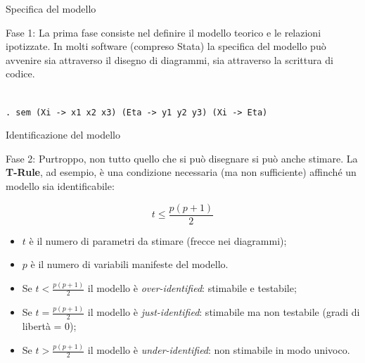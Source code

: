 \documentclass{beamer}
\begin{document}
\begin{frame}{Specifica del modello}
    \begin{block}{Fase 1:}
        La prima fase consiste nel definire il modello teorico e le relazioni ipotizzate. In molti software (compreso Stata) la specifica del modello può avvenire sia attraverso il disegno di diagrammi, sia attraverso la scrittura di codice. \\
        \vspace{1em}
        \centering
         \\
        \vspace{1em}
        \small
        \texttt{. sem (Xi -> x1 x2 x3) (Eta -> y1 y2 y3) (Xi -> Eta)}
    \end{block}
\end{frame}

\begin{frame}{Identificazione del modello}
    \begin{block}{Fase 2:}
        Purtroppo, non tutto quello che si può disegnare si può anche stimare. La \textbf{T-Rule}, ad esempio, è una condizione necessaria (ma non sufficiente) affinché un modello sia identificabile:
    \end{block}
    \[
    t \leq \frac{p(p+1)}{2}
    \]
    \begin{itemize}
        \item $t$ è il numero di parametri da stimare (frecce nei diagrammi);
        \item $p$ è il numero di variabili manifeste del modello.
    \end{itemize}
    \vspace{1em}
    \small
    \begin{itemize}
        \item Se $t < \frac{p(p+1)}{2}$ il modello è \textit{over-identified}: stimabile e testabile;
        \item Se $t = \frac{p(p+1)}{2}$ il modello è \textit{just-identified}: stimabile ma non testabile (gradi di libertà = 0);
        \item Se $t > \frac{p(p+1)}{2}$ il modello è \textit{under-identified}: non stimabile in modo univoco.
    \end{itemize}
\end{frame}
\end{document}
